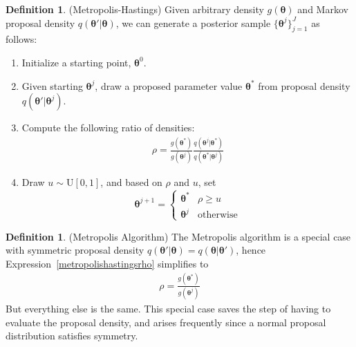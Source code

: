 \documentclass[12pt]{article}
\theoremstyle{plain}
\theoremstyle{definition}
\newtheorem{defn}[thm]{Definition}
\theoremstyle{remark}
\newcommand{\bstheta}{\boldsymbol{\theta}}
\begin{document}
\begin{defn}(Metropolis-Hastings)
Given arbitrary density $g(\bstheta)$ and Markov proposal density
$q(\bstheta'|\bstheta)$, we can generate a posterior sample
$\{\bstheta^j\}_{j=1}^J$ as follows:
\begin{enumerate}
  \item Initialize a starting point, $\bstheta^0$.
  \item Given starting $\bstheta^j$, draw a proposed parameter value
    $\bstheta^*$ from proposal density $q(\bstheta'|\bstheta^j)$.
  \item
    Compute the following ratio of densities:
    \begin{align}
      \rho =
      \frac{g(\bstheta^*)}{g(\bstheta^j)}
      \frac{q(\bstheta^j|\bstheta^*)}{q(\bstheta^*|\bstheta^j)}
      \label{metropolishastingsrho}
    \end{align}
  \item
    Draw $u\sim \text{U}[0,1]$, and based on $\rho$ and $u$, set
    \begin{equation}
      \bstheta^{j+1} =
      \begin{cases}
        \bstheta^* & \rho \geq u \\
        \bstheta^{j} & \text{otherwise}
      \end{cases}
      \label{accept}
    \end{equation}
\end{enumerate}
\end{defn}

\begin{defn}(Metropolis Algorithm)
\label{defn:metropolishastings}
The Metropolis algorithm is a special case with symmetric proposal
density $q(\bstheta'|\bstheta)=q(\bstheta|\bstheta')$, hence
Expression~\ref{metropolishastingsrho} simplifies to
\begin{align*}
      \rho =
      \frac{g(\bstheta^*)}{g(\bstheta^j)}
\end{align*}
But everything else is the same.
This special case saves the step of having to evaluate the proposal
density, and arises frequently since a normal proposal distribution
satisfies symmetry.
\end{defn}
\end{document}
